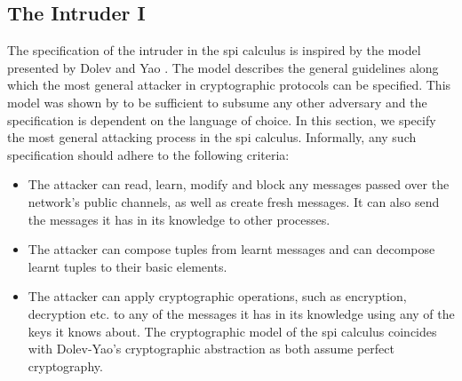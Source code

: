 \documentclass[10pt,a4paper,final,oneside,fleqn]{book}
\begin{document}
\subsection{The Intruder I\label{sect:dol}}
The specification of the intruder in the spi calculus is inspired by the model presented by Dolev and Yao \cite{dolev1}.  The model describes the general guidelines along which the most general attacker in cryptographic protocols can be specified.  This model was shown by \cite{cervesato1} to be sufficient to subsume any other adversary and the specification is dependent on the language of choice. In this section, we specify the most general attacking process in the spi calculus.  Informally, any such specification should adhere to the following criteria:
\begin{itemize}
\item
The attacker can read, learn, modify and block any messages passed over the network's public channels, as well as create fresh messages.  It can also send the messages it has in its knowledge to other processes.
\item
The attacker can compose tuples from learnt messages and can decompose learnt tuples to their basic elements.
\item
The attacker can apply cryptographic operations, such as encryption, decryption etc. to any of the messages it has in its knowledge using any of the keys it knows about.  The cryptographic model of the spi calculus coincides with Dolev-Yao's cryptographic abstraction as both assume perfect cryptography.
\end{itemize}
\end{document}
